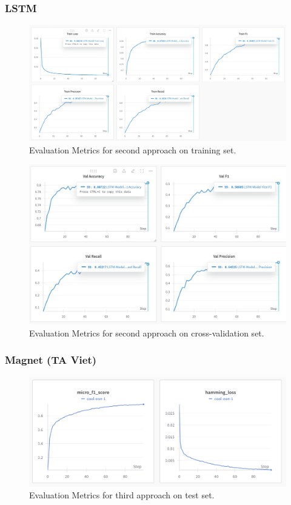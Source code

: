 \documentclass{article}
\begin{document}
\subsubsection{LSTM}
\begin{figure}[h!]
  \centering
  \includegraphics[width=\textwidth]{LSTM_TRAIN.jpeg} 
  \caption{Evaluation Metrics for second approach on training set.}
  \label{fig:your-label}
\end{figure}
\begin{figure}[h!]
  \centering
  \includegraphics[width=\textwidth]{LSTM_VAL.jpeg} 
  \caption{Evaluation Metrics for second approach on cross-validation set.}
  \label{fig:your-label}
\end{figure}

\FloatBarrier
\subsubsection{Magnet (TA Viet)} 
\begin{figure}[h!]
  \centering
  \includegraphics[width=\textwidth]{magnet_f1.png} 
  \caption{Evaluation Metrics for third approach on test set.}
  \label{fig:your-label}
\end{figure}
\end{document}
